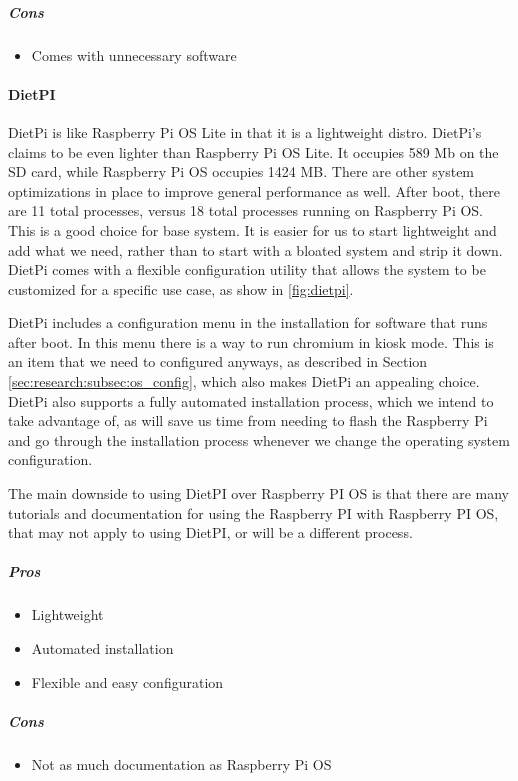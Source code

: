 \subparagraph{Cons}
\begin{itemize}
  \item Comes with unnecessary software
\end{itemize}

\paragraph{DietPI}

DietPi is like Raspberry Pi OS Lite in that it is a lightweight distro. DietPi's claims to
be even lighter than Raspberry Pi OS Lite. It occupies 589 Mb on the SD card, while
Raspberry Pi OS occupies 1424 MB. There are other system optimizations in place to improve
general performance as well. After boot, there are 11 total processes, versus 18 total
processes running on Raspberry Pi OS. This is a good choice for base system. It is easier
for us to start lightweight and add what we need, rather than to start with a bloated
system and strip it down. DietPi comes with a flexible configuration utility that allows
the system to be customized for a specific use case, as show in \autoref{fig:dietpi}.

DietPi includes a configuration menu in the installation for software that runs after
boot. In this menu there is a way to run chromium in kiosk mode. This is an item that we
need to configured anyways, as described in Section \ref{sec:research:subsec:os_config},
which also makes DietPi an appealing choice. DietPi also supports a fully automated
installation process, which we intend to take advantage of, as will save us time from
needing to flash the Raspberry Pi and go through the installation process whenever we
change the operating system configuration.

The main downside to using DietPI over Raspberry PI OS is that there are many tutorials
and documentation for using the Raspberry PI with Raspberry PI OS, that may not apply to
using DietPI, or will be a different process.

\subparagraph{Pros}
\begin{itemize}
  \item Lightweight
  \item Automated installation
  \item Flexible and easy configuration
\end{itemize}

\subparagraph{Cons}
\begin{itemize}
  \item Not as much documentation as Raspberry Pi OS
\end{itemize}

